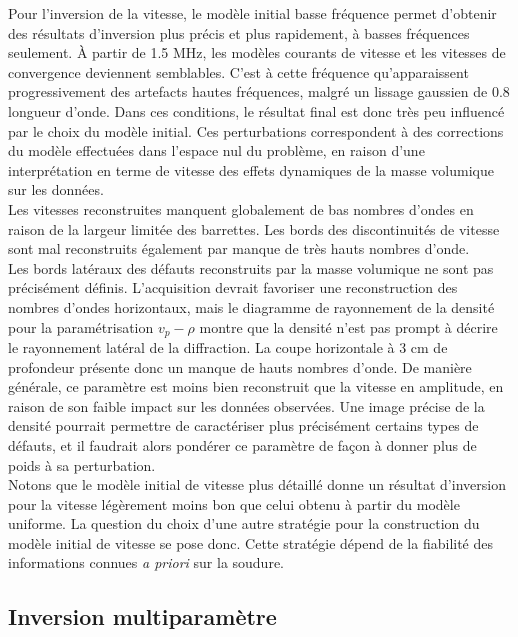 Pour l'inversion de la vitesse, le modèle initial basse fréquence permet d'obtenir des résultats d'inversion plus précis et plus rapidement, à basses fréquences seulement. À partir de 1.5 MHz, les modèles courants de vitesse et les vitesses de convergence deviennent semblables. C'est à cette fréquence qu'apparaissent progressivement  des artefacts hautes fréquences, malgré un lissage gaussien de 0.8 longueur d'onde. Dans ces conditions, le résultat final est donc très peu influencé par le choix du modèle initial. Ces perturbations correspondent à des corrections du modèle effectuées dans l'espace nul du problème, en raison d'une interprétation en terme de vitesse des effets dynamiques de la masse volumique sur les données.\\ 
\indent Les vitesses reconstruites manquent globalement de bas nombres d'ondes en raison de la largeur limitée des barrettes. Les bords des discontinuités de vitesse sont mal reconstruits également par manque de très hauts nombres d'onde. \\


Les bords latéraux des défauts reconstruits par la masse volumique ne sont pas précisément définis. L'acquisition devrait favoriser une reconstruction des nombres d'ondes horizontaux, mais le diagramme de rayonnement de la densité pour la paramétrisation $v_{p}-\rho$ montre que la densité n'est pas prompt à décrire le rayonnement latéral de la diffraction. La coupe horizontale à 3 cm de profondeur présente donc un manque de hauts nombres d'onde. De manière générale, ce paramètre est moins bien reconstruit que la vitesse en amplitude, en raison de son faible impact sur les données observées. Une image précise de la densité pourrait permettre de caractériser plus précisément certains types de défauts, et il faudrait alors pondérer ce paramètre de façon à donner plus de poids à sa perturbation.\\

Notons que le modèle initial de vitesse plus détaillé donne un résultat d'inversion pour la vitesse légèrement moins bon que celui obtenu à partir du modèle uniforme. La question du choix d'une autre stratégie pour la construction du modèle initial de vitesse se pose donc. Cette stratégie dépend de la fiabilité des informations connues \emph{a priori} sur la soudure.



\subsection{Inversion multiparamètre}

